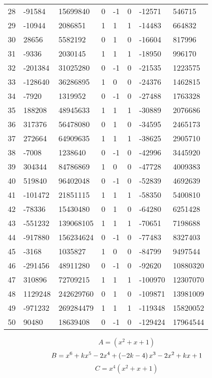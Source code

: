 \documentclass{amsart}
\begin{document}
\begin{longtable}{|l|l|l|lllll|}
28&-91584&15699840&0&-1&0&-12571&546715\\
29&-10944&2086851&1&1&1&-14483&664832\\
30&28656&5582192&0&1&0&-16604&817996\\
31&-9336&2030145&1&1&1&-18950&996170\\
32&-201384&31025280&0&-1&0&-21535&1223575\\
33&-128640&36286895&1&0&0&-24376&1462815\\
34&-7920&1319952&0&-1&0&-27488&1763328\\
35&188208&48945633&1&1&1&-30889&2076686\\
36&317376&56478080&0&1&0&-34595&2465173\\
37&272664&64909635&1&1&1&-38625&2905710\\
38&-7008&1238640&0&-1&0&-42996&3445920\\
39&304344&84786869&1&0&0&-47728&4009383\\
40&519840&96402048&0&-1&0&-52839&4692639\\
41&-101472&21851115&1&1&1&-58350&5400810\\
42&-78336&15430480&0&1&0&-64280&6251428\\
43&-551232&139068105&1&1&1&-70651&7198688\\
44&-917880&156234624&0&-1&0&-77483&8327403\\
45&-3168&1035827&1&0&0&-84799&9497544\\
46&-291456&48911280&0&-1&0&-92620&10880320\\
47&310896&72709215&1&1&1&-100970&12307070\\
48&1129248&242629760&0&1&0&-109871&13981009\\
49&-971232&269284479&1&1&1&-119348&15820052\\
50&90480&18639408&0&-1&0&-129424&17964544\\
\hline
\end{longtable}
$$A=(x^2
 + x
 + 1)$$
$$B=x^6
 + k\*x^5
 - 2\*x^4
 + \left(-2\*k
 - 4\right) \*x^3
 - 2\*x^2
 + k\*x
 + 1$$
$$C=x^4(x^2
 + x
 + 1)$$
\end{document}
